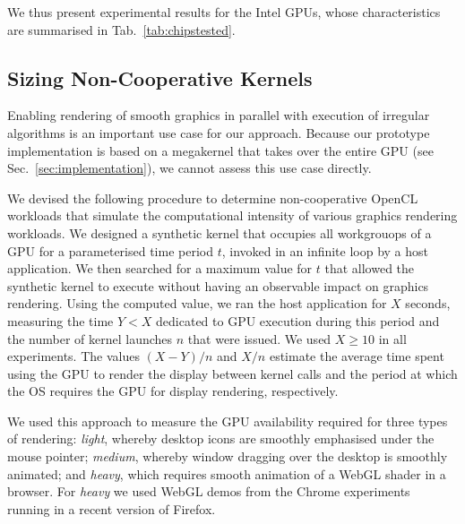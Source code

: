 \documentclass[numbers,nocopyrightspace,10pt]{sigplanconf}
\newcommand{\mytab}{Tab.~}
\newcommand{\mysec}{Sec.~}
\begin{document}
We thus present experimental results for the Intel GPUs, whose characteristics are summarised in \mytab\ref{tab:chipstested}.


\subsection{Sizing Non-Cooperative Kernels}\label{sec:sizingnoncoop}

Enabling rendering of smooth graphics in parallel with execution of irregular algorithms is an important use case for our approach.  Because our prototype implementation is based on a megakernel that takes over the entire GPU (see \mysec\ref{sec:implementation}), we cannot assess this use case directly.

We devised the following
procedure to determine non-cooperative OpenCL workloads that simulate
the computational intensity of various graphics rendering workloads.
%
We designed a synthetic kernel that occupies all workgrouops of a
GPU for a parameterised time period $t$, invoked in an infinite loop by a host application.  We then
searched for a maximum value for $t$ that allowed the
synthetic kernel to execute without having an observable impact on
graphics rendering.  Using the computed value, we
ran the host application for $X$ seconds, measuring the time $Y < X$
dedicated to GPU execution during this period and the number
of kernel launches $n$ that were issued.  We used $X \geq 10$ in all
experiments.  The values $(X-Y)/n$ and $X/n$ estimate the average time
spent using the GPU to render the display between kernel calls and the
period at which the OS requires the GPU for display rendering,
respectively.

We used this approach to measure the GPU availability required for three
types of rendering: \emph{light}, whereby desktop icons are smoothly
emphasised under the mouse pointer; \emph{medium}, whereby window
dragging over the desktop is smoothly animated; and \emph{heavy}, which
requires smooth animation of a WebGL shader in a browser.  For
\emph{heavy} we used WebGL demos from the Chrome
experiments~\cite{chrome-experiments} running
in a recent version of Firefox.


\end{document}
